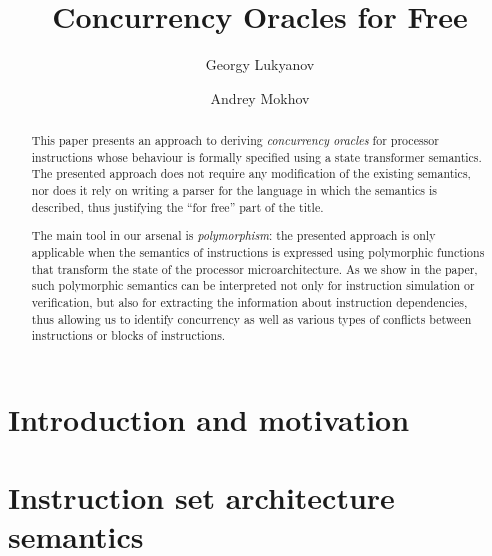 \documentclass[runningheads]{llncs}
\begin{document}
%
\title{Concurrency Oracles for Free}

%
\author{Georgy Lukyanov \and Andrey Mokhov}
%
%

\maketitle

\begin{abstract}
This paper presents an approach to deriving \emph{concurrency oracles} for
processor instructions whose behaviour is formally specified using a state
transformer semantics. The presented approach does not require any modification
of the existing semantics, nor does it rely on writing a parser for the language
in which the semantics is described, thus justifying the ``for free'' part of
the title.

The main tool in our arsenal is \emph{polymorphism}: the presented approach is
only applicable when the semantics of instructions is expressed using polymorphic
functions that transform the state of the processor microarchitecture. As we
show in the paper, such polymorphic semantics can be interpreted not only for
instruction simulation or verification, but also for extracting the information
about instruction dependencies, thus allowing us to identify concurrency as well
as various types of conflicts between instructions or blocks of instructions.

\end{abstract}

\section{Introduction and motivation\label{sec:intro}}


\section{Instruction set architecture semantics\label{sec:instructions}}

\end{document}
